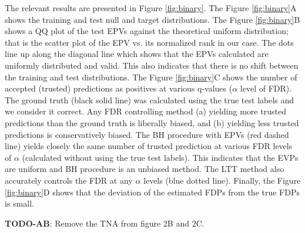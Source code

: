\documentclass{article}
\newcommand{\todo}[2]{{\color{red} {\bf TODO-#1}: #2}}
\begin{document}
The relevant results are presented in Figure \ref{fig:binary}. The Figure \ref{fig:binary}A shows the training and test null and target distributions. %
The Figure \ref{fig:binary}B shows a QQ plot of the test EPVs against the theoretical uniform distribution; that is the scatter plot of the EPV vs. its normalized rank in our case. The dots line up along the diagonal line which shows that the EPVs calculated are uniformly distributed and valid. This also indicates that there is no shift between the training and test distributions. %
The Figure \ref{fig:binary}C shows the number of accepted (trusted) predictions as positives at various q-values ($\alpha$ level of FDR). The ground truth (black solid line) was calculated using the true test labels and we consider it correct. Any FDR controlling method (a) yielding more trusted predictions than the ground truth is liberally biased, and (b) yielding less trusted predictions is conservatively biased. The BH procedure with EPVs (red dashed line) yields closely the same number of trusted prediction at various FDR levels of $\alpha$ (calculated without using the true test labels). This indicates that the EVPs are uniform and BH procedure is an unbiased method. The LTT method also accurately controls the FDR at any $\alpha$ levels (blue dotted line). Finally, the Figure \ref{fig:binary}D shows that the deviation of the estimated FDPs from the true FDPs is small.



\todo{AB}{Remove the TNA from figure 2B and 2C}.
\end{document}
